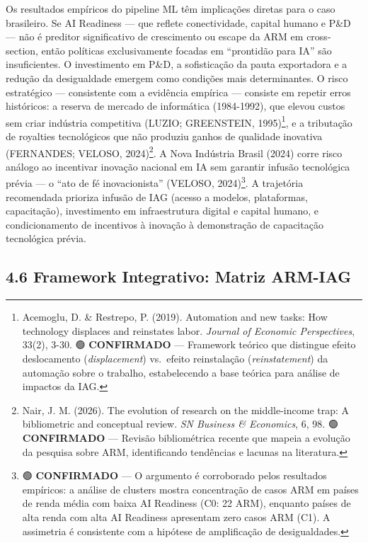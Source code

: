 \documentclass[
  brazilian,
  12pt,
]{article}
\begin{document}
Os resultados empíricos do pipeline ML têm implicações diretas para o caso brasileiro. Se AI Readiness --- que reflete conectividade, capital humano e P\&D --- não é preditor significativo de crescimento ou escape da ARM em cross-section, então políticas exclusivamente focadas em ``prontidão para IA'' são insuficientes. O investimento em P\&D, a sofisticação da pauta exportadora e a redução da desigualdade emergem como condições mais determinantes. O risco estratégico --- consistente com a evidência empírica --- consiste em repetir erros históricos: a reserva de mercado de informática (1984-1992), que elevou custos sem criar indústria competitiva (LUZIO; GREENSTEIN, 1995)\footnote{Acemoglu, D. \& Restrepo, P. (2019). Automation and new tasks: How technology displaces and reinstates labor. \emph{Journal of Economic Perspectives}, 33(2), 3-30. 🟢 \textbf{CONFIRMADO} --- Framework teórico que distingue efeito deslocamento (\emph{displacement}) vs.~efeito reinstalação (\emph{reinstatement}) da automação sobre o trabalho, estabelecendo a base teórica para análise de impactos da IAG.}, e a tributação de royalties tecnológicos que não produziu ganhos de qualidade inovativa (FERNANDES; VELOSO, 2024)\footnote{Nair, J. M. (2026). The evolution of research on the middle-income trap: A bibliometric and conceptual review. \emph{SN Business \& Economics}, 6, 98. 🟢 \textbf{CONFIRMADO} --- Revisão bibliométrica recente que mapeia a evolução da pesquisa sobre ARM, identificando tendências e lacunas na literatura.}. A Nova Indústria Brasil (2024) corre risco análogo ao incentivar inovação nacional em IA sem garantir infusão tecnológica prévia --- o ``ato de fé inovacionista'' (VELOSO, 2024)\footnote{🟢 \textbf{CONFIRMADO} --- O argumento é corroborado pelos resultados empíricos: a análise de clusters mostra concentração de casos ARM em países de renda média com baixa AI Readiness (C0: 22 ARM), enquanto países de alta renda com alta AI Readiness apresentam zero casos ARM (C1). A assimetria é consistente com a hipótese de amplificação de desigualdades.}. A trajetória recomendada prioriza infusão de IAG (acesso a modelos, plataformas, capacitação), investimento em infraestrutura digital e capital humano, e condicionamento de incentivos à inovação à demonstração de capacitação tecnológica prévia.

\subsection{4.6 Framework Integrativo: Matriz ARM-IAG}\label{framework-integrativo-matriz-arm-iag}
\end{document}
